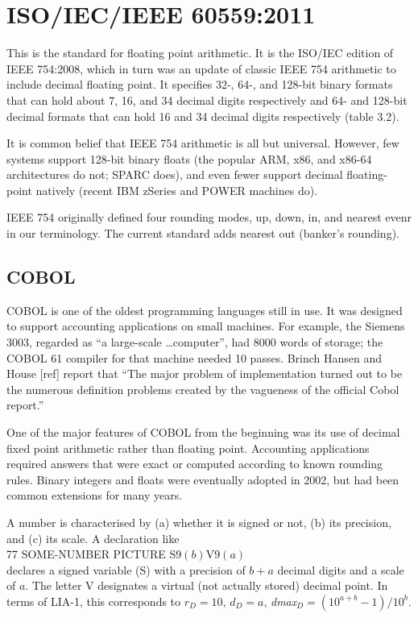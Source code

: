 \documentclass{article}
\begin{document}
\section{ISO/IEC/IEEE 60559:2011}

This is the standard for floating point arithmetic.
It is the ISO/IEC edition of IEEE 754:2008, which in
turn was an update of classic IEEE 754 arithmetic to
include decimal floating point.  It specifies
32-, 64-, and 128-bit binary formats that can hold about 7,
16, and 34 decimal digits respectively
and 64- and 128-bit decimal formats that can hold
16 and 34 decimal digits respectively (table 3.2).

It is common belief that IEEE 754 arithmetic is all but
universal.  However, few systems support 128-bit binary floats
(the popular ARM, x86, and x86-64 architectures do not; SPARC
does), and even fewer support decimal floating-point natively
(recent IBM zSeries and POWER machines do).

IEEE 754 originally defined four rounding modes, up, down, in,
and nearest evenr in our terminology.  The current standard
adds nearest out (banker's rounding).

\subsection{COBOL}

COBOL is one of the oldest programming languages still in use.
It was designed to support accounting applications on small
machines.  For example, the Siemens 3003, regarded as ``a large-scale
\dots computer'', had 8000 words of
storage; the COBOL 61 compiler for that machine needed 10 passes.
Brinch Hansen and House [ref] report that ``The major problem of
implementation turned out to be the numerous definition problems
created by the vagueness of the official Cobol report.''

One of the major features of COBOL from the beginning was its
use of decimal fixed point arithmetic rather than floating point.
Accounting applications required answers that were exact or
computed according to known rounding rules.  Binary integers
and floats were eventually adopted in 2002, but had been common
extensions for many years.  

A number is characterised by (a) whether it is signed or not,
(b) its precision, and (c) its scale.  A declaration like\\
77 SOME-NUMBER PICTURE S9$(b)$V$9(a)$\\
declares a signed variable (S) with a precision of $b+a$
decimal digits and a scale of $a$.  The letter V designates
a virtual (not actually stored) decimal point.  In terms of
LIA-1, this corresponds to $r_D = 10$, $d_D = a$,
{\it dmax}${}_D = (10^{a+b}-1)/10^b$.
\end{document}
